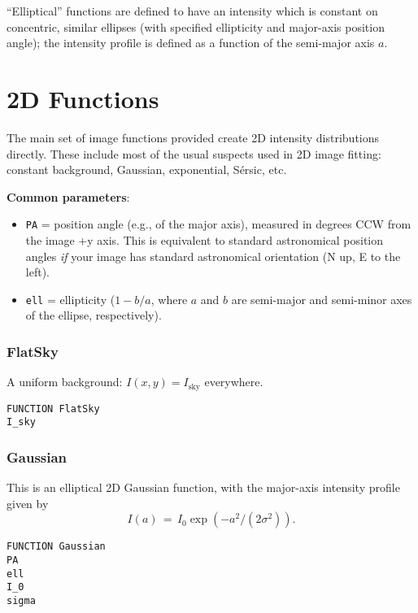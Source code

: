 \documentclass[10pt,a4paper,article]{memoir}
\begin{document}
``Elliptical'' functions are defined to have an intensity which is constant on
concentric, similar ellipses (with specified ellipticity and major-axis position angle);
the intensity profile is defined as a function of the semi-major axis $a$.


\section{2D Functions}

The main set of image functions provided create 2D intensity distributions
directly. These include most of the usual suspects used in 2D image fitting:
constant background, Gaussian, exponential, S{\'e}rsic, etc.

\medskip

\textbf{Common parameters}: 
\begin{itemize}
\item \texttt{PA} = position angle (e.g., of the major axis), measured in degrees CCW from
the image +y axis. This is equivalent to standard astronomical position angles \textit{if}
your image has standard astronomical orientation (N up, E to the left).
\item \texttt{ell} = ellipticity ($1 - b/a$, where $a$ and $b$ are semi-major and semi-minor
axes of the ellipse, respectively).
\end{itemize}


\subsubsection{FlatSky}

A uniform background: $I(x,y) = I_{\mathrm{sky}}$ everywhere.

\begin{verbatim}
FUNCTION FlatSky
I_sky
\end{verbatim}


\subsubsection{Gaussian}

This is an elliptical 2D Gaussian function, with the major-axis intensity
profile given by
\begin{equation}
I(a) \, = \, I_{0} \exp(-a^2/(2 \sigma^2)).
\end{equation}

\begin{verbatim}
FUNCTION Gaussian
PA
ell
I_0
sigma
\end{verbatim}
\end{document}
